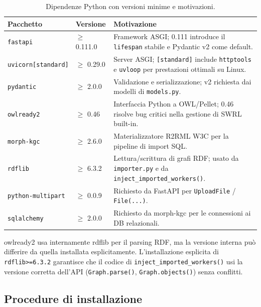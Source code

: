 \documentclass[a4paper,12pt]{article}
\begin{document}
\begin{table}[H]
\centering
\caption{Dipendenze Python con versioni minime e motivazioni.}
\begin{tabular}{L{4.5cm} L{2.5cm} L{5.5cm}}
\toprule
\textbf{Pacchetto} & \textbf{Versione} & \textbf{Motivazione} \\
\midrule
\texttt{fastapi} & $\geq$ 0.111.0 &
  Framework ASGI; 0.111 introduce il \texttt{lifespan} stabile e
  Pydantic v2 come default. \\[3pt]
\texttt{uvicorn[standard]} & $\geq$ 0.29.0 &
  Server ASGI; \texttt{[standard]} include \texttt{httptools} e
  \texttt{uvloop} per prestazioni ottimali su Linux. \\[3pt]
\texttt{pydantic} & $\geq$ 2.0.0 &
  Validazione e serializzazione; v2 richiesta dai modelli
  di \texttt{models.py}. \\[3pt]
\texttt{owlready2} & $\geq$ 0.46 &
  Interfaccia Python a OWL/Pellet; 0.46 risolve bug
  critici nella gestione di SWRL built-in. \\[3pt]
\texttt{morph-kgc} & $\geq$ 2.6.0 &
  Materializzatore R2RML W3C per la pipeline di import SQL. \\[3pt]
\texttt{rdflib} & $\geq$ 6.3.2 &
  Lettura/scrittura di grafi RDF; usato da \texttt{importer.py}
  e da \texttt{inject\_imported\_workers()}. \\[3pt]
\texttt{python-multipart} & $\geq$ 0.0.9 &
  Richiesto da FastAPI per \texttt{UploadFile} / \texttt{File(...)}. \\[3pt]
\texttt{sqlalchemy} & $\geq$ 2.0.0 &
  Richiesto da morph-kgc per le connessioni ai DB relazionali. \\
\bottomrule
\end{tabular}
\end{table}

\begin{infobox}
owlready2 usa internamente rdflib per il parsing RDF, ma la versione
interna pu\`{o} differire da quella installata esplicitamente.
L'installazione esplicita di \texttt{rdflib>=6.3.2} garantisce che il
codice di \texttt{inject\_imported\_workers()} usi la versione corretta
dell'API (\texttt{Graph.parse()}, \texttt{Graph.objects()}) senza
conflitti.
\end{infobox}

\subsection{Procedure di installazione}
\end{document}
